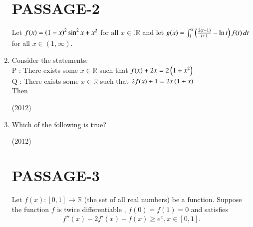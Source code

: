 \documentclass[journal,,12pt,twocolumn]{IEEEtran}
\theoremstyle{remark}
\begin{document}
\begin{enumerate}
\section*{PASSAGE-2}
Let $f(x)=\left(1-x\right)^2 \sin^2 x + x^2$ for all $x \in \mathbb{IR}$ and let $g(x)=
\int_{1}^{x} \left(\frac{2(t-1)}{t+1} - \ln t\right)  f(t) \, dt $ for all $x \in (1 ,\infty)$.
\item Consider the statements:\\
P : There exists some $x \in \mathbb{R}$ such that $f(x) + 2x = 2\left(1+x^2\right)$\\
Q : There exists some $x \in\mathbb{R}$ such that $2f(x) + 1 = 2x\left(1+x\right)$\\
    Then
\begin{enumerate}
\end{enumerate}

\hfill{(2012)}



\item Which of the following is true?
\begin{enumerate}
\end{enumerate}
\hfill{(2012)}

\section*{PASSAGE-3}
Let $f(x) : [0,1] \to\mathbb{R}$
(the set of all real numbers) be a function. Suppose the function $f$ is twice differentiable , $f(0)=f(1)=0$ and satisfies \begin{align*} f''(x)-2f'(x)+f(x) \geq e^x , x \in [0,1].\end{align*} 


\end{enumerate}
\end{document}

